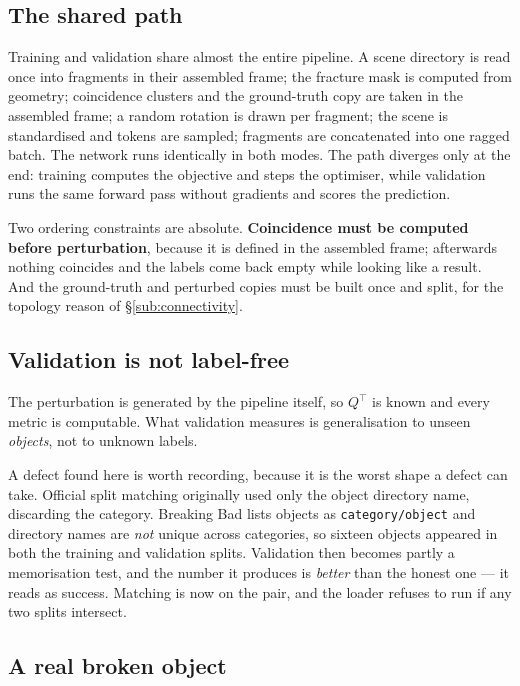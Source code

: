 \documentclass[11pt,a4paper]{report}
\begin{document}
\subsection{The shared path}

Training and validation share almost the entire pipeline. A scene directory is
read once into fragments in their assembled frame; the fracture mask is computed
from geometry; coincidence clusters and the ground-truth copy are taken in the
assembled frame; a random rotation is drawn per fragment; the scene is
standardised and tokens are sampled; fragments are concatenated into one ragged
batch. The network runs identically in both modes. The path diverges only at the
end: training computes the objective and steps the optimiser, while validation
runs the same forward pass without gradients and scores the prediction.

Two ordering constraints are absolute. \textbf{Coincidence must be computed
before perturbation}, because it is defined in the assembled frame; afterwards
nothing coincides and the labels come back empty while looking like a result.
And the ground-truth and perturbed copies must be built once and split, for the
topology reason of \S\ref{sub:connectivity}.

\subsection{Validation is not label-free}

The perturbation is generated by the pipeline itself, so $Q^{\top}$ is known and
every metric is computable. What validation measures is generalisation to unseen
\emph{objects}, not to unknown labels.

A defect found here is worth recording, because it is the worst shape a defect
can take. Official split matching originally used only the object directory
name, discarding the category. Breaking Bad lists objects as
\texttt{category/object} and directory names are \emph{not} unique across
categories, so sixteen objects appeared in both the training and validation
splits. Validation then becomes partly a memorisation test, and the number it
produces is \emph{better} than the honest one --- it reads as success. Matching
is now on the pair, and the loader refuses to run if any two splits intersect.

\subsection{A real broken object}
\end{document}
